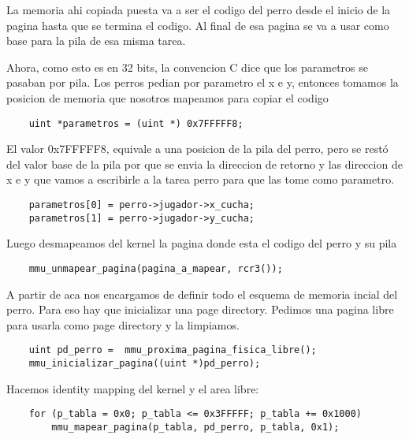 La memoria ahi copiada puesta va a ser el codigo del perro desde el inicio de la pagina hasta que se termina el codigo. Al final de esa pagina se va a usar como base para la pila de esa misma tarea.

Ahora, como esto es en 32 bits, la convencion C dice que los parametros se pasaban por pila.
Los perros pedian por parametro el x e y, entonces tomamos la posicion de memoria que nosotros mapeamos para copiar el codigo
\begin{codesnippet}
\begin{verbatim}
	uint *parametros = (uint *) 0x7FFFFF8;
	    \end{verbatim}
\end{codesnippet}

El valor 0x7FFFFF8,  equivale a una posicion de la pila del perro, pero se restó del valor base de la pila por que se envia la direccion de retorno y las direccion de x e y que vamos a escribirle a la tarea perro para que las tome como parametro. 
\begin{codesnippet}
\begin{verbatim}
	parametros[0] = perro->jugador->x_cucha;
	parametros[1] = perro->jugador->y_cucha; 
    \end{verbatim}
\end{codesnippet}


Luego desmapeamos del kernel la pagina donde esta el codigo del perro y su pila
\begin{codesnippet}
\begin{verbatim}
    mmu_unmapear_pagina(pagina_a_mapear, rcr3());
    \end{verbatim}
\end{codesnippet}



A partir de aca nos encargamos de definir todo el esquema de memoria incial del perro.
Para eso hay que inicializar una page directory. Pedimos una pagina libre para usarla como page directory y la limpiamos.
\begin{codesnippet}
\begin{verbatim}
 	uint pd_perro =  mmu_proxima_pagina_fisica_libre();
  	mmu_inicializar_pagina((uint *)pd_perro);
    \end{verbatim}
\end{codesnippet}


Hacemos identity mapping del kernel y el area libre:
\begin{codesnippet}
\begin{verbatim}
	for (p_tabla = 0x0; p_tabla <= 0x3FFFFF; p_tabla += 0x1000)
        mmu_mapear_pagina(p_tabla, pd_perro, p_tabla, 0x1);
    \end{verbatim}
\end{codesnippet}

